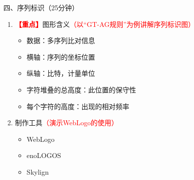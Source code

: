 \documentclass{TIJMUjiaoanLL}
\begin{document}
\vspace*{0.2cm}
\noindent
四、序列标识（25分钟）
\begin{enumerate}
  \item \textcolor{red}{\textbf{【重点】}}图形含义\textcolor{red}{（以“GT-AG规则”为例讲解序列标识图）}
    \begin{itemize}
      \item 数据：多序列比对信息
      \item 横轴：序列的坐标位置
      \item 纵轴：比特，计量单位
      \item 字符堆叠的总高度：此位置的保守性
      \item 每个字符的高度：出现的相对频率
    \end{itemize}
  \item 制作工具\textcolor{red}{（演示WebLogo的使用）}
    \begin{itemize}
      \item WebLogo
      \item enoLOGOS
      \item Skylign
    \end{itemize}
\end{enumerate}
\end{document}
